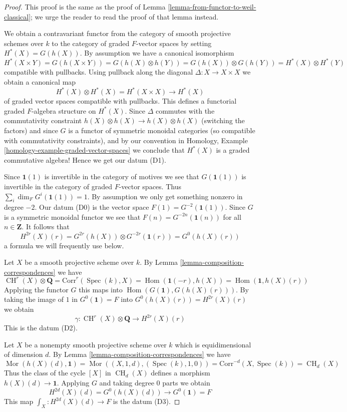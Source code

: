 \documentclass{stacks-project}
\theoremstyle{plain}
\theoremstyle{definition}
\theoremstyle{remark}
\numberwithin{equation}{subsection}
\def\Spec{\mathop{\mathrm{Spec}}}
\def\Hom{\mathop{\mathrm{Hom}}\nolimits}
\def\Mor{\mathop{\mathrm{Mor}}\nolimits}
\def\CH{\mathop{\mathrm{CH}}\nolimits}
\begin{document}
\begin{proof}
This proof is the same as the proof of
Lemma \ref{lemma-from-functor-to-weil-classical};
we urge the reader to read the proof of that lemma instead.

\medskip\noindent
We obtain a contravariant functor from the category of smooth
projective schemes over $k$ to the category of graded $F$-vector spaces
by setting $H^*(X) = G(h(X))$. By assumption we have a canonical
isomorphism
$$
H^*(X \times Y) = G(h(X \times Y)) = G(h(X) \otimes h(Y)) =
G(h(X)) \otimes G(h(Y)) = H^*(X) \otimes H^*(Y)
$$
compatible with pullbacks. Using pullback along the diagonal
$\Delta : X \to X \times X$ we obtain a canonical map
$$
H^*(X) \otimes H^*(X) = H^*(X \times X) \to H^*(X)
$$
of graded vector spaces compatible with pullbacks.
This defines a functorial graded $F$-algebra structure on
$H^*(X)$. Since $\Delta$ commutes with the commutativity
constraint $h(X) \otimes h(X) \to h(X) \otimes h(X)$ (switching the factors)
and since $G$ is a functor of symmetric monoidal categories (so compatible with
commutativity constraints), and by our convention in
Homology, Example \ref{homology-example-graded-vector-spaces}
we conclude that $H^*(X)$ is a graded
commutative algebra! Hence we get our datum (D1).

\medskip\noindent
Since $\mathbf{1}(1)$ is invertible in the category of motives
we see that $G(\mathbf{1}(1))$ is invertible in the category of
graded $F$-vector spaces. Thus $\sum_i \dim_F G^i(\mathbf{1}(1)) = 1$.
By assumption we only get something nonzero in degree $-2$.
Our datum (D0) is the vector space $F(1) = G^{-2}(\mathbf{1}(1))$.
Since $G$ is a symmetric monoidal functor we see that
$F(n) = G^{-2n}(\mathbf{1}(n))$ for all $n \in \mathbf{Z}$.
It follows that
$$
H^{2r}(X)(r) = G^{2r}(h(X)) \otimes G^{-2r}(\mathbf{1}(r)) =
G^0(h(X)(r))
$$
a formula we will frequently use below.

\medskip\noindent
Let $X$ be a smooth projective scheme over $k$. By
Lemma \ref{lemma-composition-correspondences} we have
$$
\CH^r(X) \otimes \mathbf{Q} = \text{Corr}^r(\Spec(k), X) =
\Hom(\mathbf{1}(-r), h(X)) = \Hom(\mathbf{1}, h(X)(r))
$$
Applying the functor $G$ this maps into
$\Hom(G(\mathbf{1}), G(h(X)(r)))$.
By taking the image of $1$ in $G^0(\mathbf{1}) = F$
into $G^0(h(X)(r)) = H^{2r}(X)(r)$ we obtain
$$
\gamma :
\CH^r(X) \otimes \mathbf{Q} \longrightarrow H^{2r}(X)(r)
$$
This is the datum (D2).

\medskip\noindent
Let $X$ be a nonempty smooth projective scheme over $k$
which is equidimensional of dimension $d$. By
Lemma \ref{lemma-composition-correspondences} we have
$$
\Mor(h(X)(d), \mathbf{1}) = \Mor((X, 1, d), (\Spec(k), 1, 0)) =
\text{Corr}^{-d}(X, \Spec(k)) = \CH_d(X)
$$
Thus the class of the cycle $[X]$ in $\CH_d(X)$ defines a morphism
$h(X)(d) \to \mathbf{1}$. Applying $G$ and taking degree $0$
parts we obtain
$$
H^{2d}(X)(d) = G^0(h(X)(d)) \longrightarrow G^0(\mathbf{1}) = F
$$
This map $\int_X : H^{2d}(X)(d) \to F$ is the datum (D3).


\end{proof}
\end{document}
